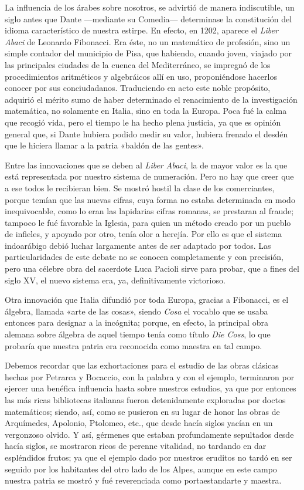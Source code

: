 \documentclass[a4paper, 12pt, draft]{article}
\begin{document}
{La influencia de los árabes sobre nosotros, se advirtió de manera indiscutible, un siglo antes que Dante ---mediante su Comedia--- determinase la constitución del idioma característico de nuestra estirpe. En efecto, en 1202, aparece el \textit{ Liber Abaci} de Leonardo Fibonacci. Era éste, no un matemático de profesión, sino un simple contador del municipio de Pisa, que habiendo, cuando joven, viajado por las principales ciudades de la cuenca del Mediterráneo, se impregnó de los procedimientos aritméticos y algebráicos allí en uso, proponiéndose hacerlos conocer por sus conciudadanos. Traduciendo en acto este noble propósito, adquirió el mérito sumo
de haber determinado el renacimiento de la
investigación  matemática, no solamente en Italia, sino en toda la Europa. Poca fué la calma que recogió vida, pero el tiempo le ha hecho plena justicia, ya que es opinión general que, si Dante hubiera podido medir su valor, hubiera frenado el desdén que le hiciera llamar a la patria «baldón de las gentes».

Entre las innovaciones que se deben al \textit{ Liber Abaci}, la de mayor valor es la que está representada por nuestro sistema de numeración. Pero no hay que creer que a ese todos le recibieran bien. Se mostró hostil la clase de los comerciantes, porque temían que las nuevas cifras, cuya forma no estaba determinada en modo inequivocable, como lo eran las lapidarias cifras romanas, se prestaran al fraude; tampoco le fué favorable la Iglesia, para quien un método creado por un pueblo de infieles, y apoyado por otro, tenía olor a herejía. Por ello es que el sistema indoarábigo debió luchar largamente antes de ser adaptado por todos. Las particularidades de este debate no se conocen completamente y con precisión, pero una célebre obra del sacerdote Luca Pacioli sirve para probar, que a fines del siglo XV, el nuevo sistema era, ya, definitivamente victorioso.


Otra innovación que Italia difundió por toda Europa, gracias a Fibonacci, es el álgebra, llamada «arte de las cosas», siendo \textit{ Cosa} el vocablo que se usaba entonces para designar a la incógnita; porque, en efecto, la principal obra alemana sobre álgebra de aquel tiempo tenía como título \textit{ Die Coss},
lo que probaría que nuestra patria era reconocida como maestra en tal campo.

Debemos recordar que las exhortaciones para el estudio de las obras clásicas hechas por Petrarca y Bocaccio, con la palabra y con el ejemplo, terminaron por ejercer una benéfica influencia hasta sobre nuestros estudios, ya que por entonces las más ricas bibliotecas italianas fueron detenidamente exploradas por doctos matemáticos; siendo, así, como se pusieron en su lugar de honor las obras de Arquímedes, Apolonio, Ptolomeo, etc., que desde hacía siglos yacían en un vergonzoso olvido. Y así, gérmenes que estaban profundamente sepultados desde hacía siglos, se mostraron ricos de perenne vitalidad, no tardando en dar espléndidos frutos; ya que el ejemplo dado por nuestros eruditos no tardó en ser seguido por los habitantes del otro lado de los Alpes, aunque en este campo nuestra patria se mostró y fué reverenciada como portaestandarte y maestra.


}
\end{document}
